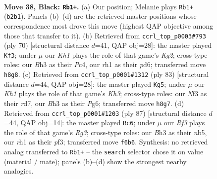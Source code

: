 \documentclass[11pt]{article}
\begin{document}
\clearpage

\begin{figure}[p]\centering
\begin{subfigure}{0.46\textwidth}\centering
\resizebox{\linewidth}{!}{%
\newchessgame
\chessboard[
  setfen={7k/R4p1p/5rp1/3P4/1p2P3/5nPb/1r5P/3K3R b - - 1 38},
  showmover=false,
  pgfstyle=straightmove, color=movearrow, markmove={b2-b1}
]}
\caption{}
\end{subfigure}\hfill
\begin{subfigure}{0.46\textwidth}\centering
\resizebox{\linewidth}{!}{%
\newchessgame
\chessboard[
  setfen={4r3/1k3rbp/1p1p4/p2N4/2P2P2/1P5P/2R3K1/3R4 w - - 1 36},
  showmover=false,
  pgfstyle=straightmove, color=movearrow, markmove={g2-f3}
]}
\caption{}
\end{subfigure}
\\[4pt]
\begin{subfigure}{0.46\textwidth}\centering
\resizebox{\linewidth}{!}{%
\newchessgame
\chessboard[
  setfen={8/2RR1p2/5rpk/p3r3/1p2p1P1/1P2P3/P4PK1/8 b - - 0 42},
  showmover=false,
  pgfstyle=straightmove, color=movearrow, markmove={h6-g5}
]}
\caption{}
\end{subfigure}\hfill
\begin{subfigure}{0.46\textwidth}\centering
\resizebox{\linewidth}{!}{%
\newchessgame
\chessboard[
  setfen={7k/1R4p1/1p4rp/pN6/P4nP1/5P1P/7K/8 b - - 0 44},
  showmover=false,
  pgfstyle=straightmove, color=movearrow, markmove={g6-c6}
]}
\caption{}
\end{subfigure}
\caption{\textbf{Move 38, Black: \texttt{Rb1+}.} (a) Our position; Melanie plays \texttt{Rb1+} (\texttt{b2b1}). Panels (b)--(d) are the retrieved master positions whose correspondence most drove this move (highest QAP objective among those that transfer to it). (b) Retrieved from \texttt{ccrl\_top\_p0003\#793} (ply 70) [structural distance $d$=41, QAP obj=28]: the master played \texttt{Kf3}; under $\mu$ our \emph{Kh1} plays the role of that game's \emph{Kg2}; cross-type roles: our \emph{B}h3 as their \emph{P}c4, our \emph{r}h1 as their \emph{p}d6; transferred move \texttt{h8g8}. (c) Retrieved from \texttt{ccrl\_top\_p0001\#1312} (ply 83) [structural distance $d$=44, QAP obj=28]: the master played \texttt{Kg5}; under $\mu$ our \emph{Kh1} plays the role of that game's \emph{Kh3}; cross-type roles: our \emph{N}f3 as their \emph{r}d7, our \emph{B}h3 as their \emph{P}g6; transferred move \texttt{h8g7}. (d) Retrieved from \texttt{ccrl\_top\_p0001\#1203} (ply 87) [structural distance $d$=44, QAP obj=14]: the master played \texttt{Rc6}; under $\mu$ our \emph{Rf3} plays the role of that game's \emph{Rg3}; cross-type roles: our \emph{B}h3 as their \emph{n}b5, our \emph{r}h1 as their \emph{p}f3; transferred move \texttt{f6b6}. Synthesis: no retrieved analog transferred to \texttt{Rb1+} -- the \texttt{search} selector chose it on value (material / mate); panels (b)--(d) show the strongest nearby analogies.}
\label{fig:thought-m75}
\end{figure}
\end{document}
